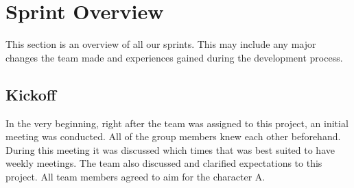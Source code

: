\section{Sprint Overview}
\label{sec:sprintOverview}
This section is an overview of all our sprints. This may include any major changes the team made and experiences gained during the development process. 

\subsection{Kickoff}
In the very beginning, right after the team was assigned to this project, an initial meeting was conducted. All of the group members knew each other beforehand. During this meeting it was discussed which times that was best suited to have weekly meetings. The team also discussed and clarified expectations to this project. All team members agreed to aim for the character A.











